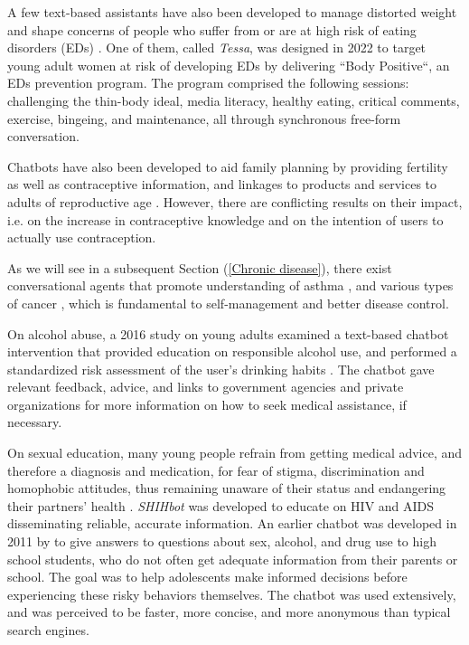A few text-based assistants have also been developed to manage distorted weight and shape concerns of people who suffer from or are at high risk of eating disorders (EDs) \cite{Tessa2022}. One of them, called \textit{Tessa}, was designed in 2022 to target young adult women at risk of developing EDs by delivering ``Body Positive``, an EDs prevention program. The program comprised the following sessions: challenging the thin-body ideal, media literacy, healthy eating, critical comments, exercise, bingeing, and maintenance, all through synchronous free-form conversation.

Chatbots have also been developed to aid family planning by providing fertility as well as contraceptive information, and linkages to products and services to adults of reproductive age \cite{contraceptionreview2024}. However, there are conflicting results on their impact, i.e. on the increase in contraceptive knowledge and on the intention of users to actually use contraception.

As we will see in a subsequent Section (\ref{Chronic disease}), there exist conversational agents that promote understanding of asthma \cite{max2021}, and various types of cancer \cite{vik2020}, which is fundamental to self-management and better disease control.

On alcohol abuse, a 2016 study on young adults examined a text-based chatbot intervention that provided education on responsible alcohol use, and  performed a standardized risk assessment of the user's drinking habits \cite{alcoholism2016}. The chatbot gave relevant feedback, advice, and links to government agencies and private organizations for more information on how to seek medical assistance, if necessary.

On sexual education, many young people refrain from getting medical advice, and therefore a diagnosis and medication, for fear of stigma, discrimination and homophobic attitudes, thus remaining unaware of their status and endangering their partners' health \cite{shihbot2017}. \textit{SHIHbot} was developed to educate on HIV and AIDS disseminating reliable, accurate information. An earlier chatbot was developed in 2011 by \cite{youngedu2011} to give answers to questions about sex, alcohol, and drug use to high school students, who do not often get adequate information from their parents or school. The goal was to help adolescents make informed decisions before experiencing these risky behaviors themselves. The chatbot was used extensively, and was perceived to be faster, more concise, and more anonymous than typical search engines.

